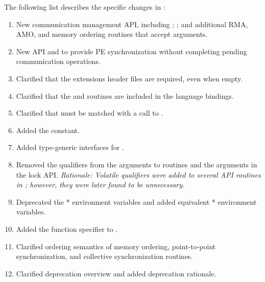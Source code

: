 The following list describes the specific changes in \openshmem[1.4]:
\begin{enumerate}
%
\item New communication management \ac{API}, including ;
    ; and additional \ac{RMA}, \ac{AMO}, and memory ordering
    routines that accept  arguments.
%
%
\item New \ac{API}  and  to provide \ac{PE}
    synchronization without completing pending communication operations.
%
%
\item Clarified that the \openshmem extensions header files are required, even when empty.
%
%
\item Clarified that the  and 
    routines are included in the \Fortran language bindings.
%
%
\item Clarified that  must be matched with a call to
    .
%
%
\item Added the  constant.
%
%
\item Added type-generic interfaces for .
%
%
\item Removed the  qualifiers from the  arguments to
 routines and the  arguments in the lock \ac{API}.
\emph{Rationale: Volatile qualifiers were added to several \ac{API} routines in
\openshmem[1.3]; however, they were later found to be unnecessary.}
%
%
\item Deprecated the * environment variables and added equivalent
* environment variables.
%
%
\item Added the \Cstd[11]  function specifier to
.
%
%
\item Clarified ordering semantics of memory ordering, point-to-point synchronization, and collective
synchronization routines.
%
\item Clarified deprecation overview and added deprecation rationale.

\end{enumerate}

